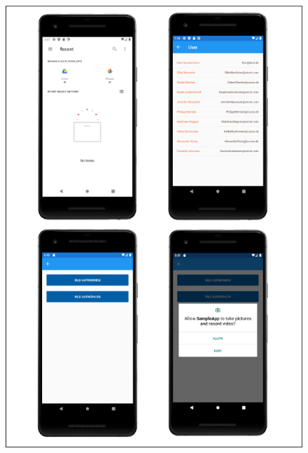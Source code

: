 \newpage
\begin{figure}[ht!]
 \includegraphics[width=\textwidth,keepaspectratio]{Images/Screenshot/AndroidScreenshot2.png}
\end{figure}
